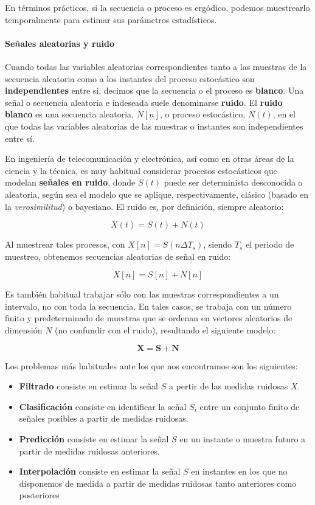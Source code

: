 \documentclass[11pt]{article}
\providecommand{\tightlist}{%
      \setlength{\itemsep}{0pt}\setlength{\parskip}{0pt}}
\begin{document}
En términos prácticos, si la secuencia o proceso es ergódico, podemos
muestrearlo temporalmente para estimar sus parámetros estadísticos.

    \hypertarget{seuxf1ales-aleatorias-y-ruido}{%
\paragraph{Señales aleatorias y
ruido}\label{seuxf1ales-aleatorias-y-ruido}}

Cuando todas las variables aleatorias correspondientes tanto a las
muestras de la secuencia aleatoria como a los instantes del proceso
estocástico son \textbf{independientes} entre sí, decimos que la
secuencia o el proceso es \textbf{blanco}. Una señal o secuencia
aleatoria e indeseada suele denominarse \textbf{ruido}. El \textbf{ruido
blanco} es una secuencia aleatoria, \(N[n]\), o proceso estocástico,
\(N(t)\), en el que todas las variables aleatorias de las muestras o
instantes son independientes entre sí.

En ingeniería de telecomunicación y electrónica, así como en otras áreas
de la ciencia y la técnica, es muy habitual considerar procesos
estocásticos que modelan \textbf{señales en ruido}, donde \(S(t)\) puede
ser determinista desconocida o aleatoria, según sea el modelo que se
aplique, respectivamente, clásico (basado en la \emph{verosimilitud}) o
bayesiano. El ruido es, por definición, siempre aleatorio:

\[X(t) = S(t) + N(t)\]

Al muestrear tales procesos, con \(X[n] = S(n\Delta T_s)\), siendo
\(T_s\) el periodo de muestreo, obtenemos secuencias aleatorias de señal
en ruido:

\[X[n] = S[n] + N[n]\]

    Es también habitual trabajar sólo con las muestras correspondientes a un
intervalo, no con toda la secuencia. En tales casos, se trabaja con un
número finito y predeterminado de muestras que se ordenan en vectores
aleatorios de dimensión \(N\) (no confundir con el ruido), resultando el
siguiente modelo:

\[\mathbf X = \mathbf S + \mathbf N\]

Los problemas más habituales ante los que nos encontramos son los
siguientes:

\begin{itemize}
\tightlist
\item
  \textbf{Filtrado} consiste en estimar la señal \(S\) a pertir de las
  medidas ruidosas \(X\).
\item
  \textbf{Clasificación} consiste en identificar la señal \(S_i\) entre
  un conjunto finito de señales posibles a partir de medidas ruidosas.
\item
  \textbf{Predicción} consiste en estimar la señal \(S\) en un instante
  o muestra futuro a partir de medidas ruidosas anteriores.
\item
  \textbf{Interpolación} consiste en estimar la señal \(S\) en instantes
  en los que no disponemos de medida a partir de medidas ruidosas tanto
  anteriores como posteriores
\end{itemize}
\end{document}
